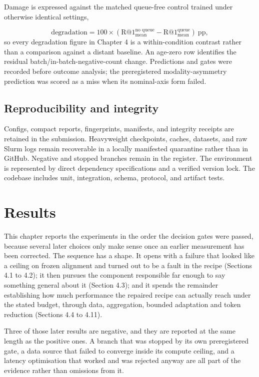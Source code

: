 \documentclass[11pt,a4paper,oneside]{report}
\begin{document}
Damage is expressed against the matched queue-free control trained under otherwise identical settings,

\begin{equation*}
\mathrm{degradation} = 100 \times
\left( \mathrm{R@1}^{\text{no queue}}_{\text{mean}}
     - \mathrm{R@1}^{\text{queue}}_{\text{mean}} \right)
\ \text{pp},
\end{equation*}
so every degradation figure in Chapter 4 is a within-condition contrast rather than a comparison against a distant baseline. An age-zero row identifies the residual batch/in-batch-negative-count change. Predictions and gates were recorded before outcome analysis; the preregistered modality-asymmetry prediction was scored as a miss when its nominal-axis form failed.

\section{Reproducibility and integrity}
Configs, compact reports, fingerprints, manifests, and integrity receipts are retained in the submission. Heavyweight checkpoints, caches, datasets, and raw Slurm logs remain recoverable in a locally manifested quarantine rather than in GitHub. Negative and stopped branches remain in the register. The environment is represented by direct dependency specifications and a verified version lock. The codebase includes unit, integration, schema, protocol, and artifact tests.

\chapter{Results}
This chapter reports the experiments in the order the decision gates were passed, because several later choices only make sense once an earlier measurement has been corrected. The sequence has a shape. It opens with a failure that looked like a ceiling on frozen alignment and turned out to be a fault in the recipe (Sections 4.1 to 4.2); it then pursues the component responsible far enough to say something general about it (Section 4.3); and it spends the remainder establishing how much performance the repaired recipe can actually reach under the stated budget, through data, aggregation, bounded adaptation and token reduction (Sections 4.4 to 4.11).

Three of those later results are negative, and they are reported at the same length as the positive ones. A branch that was stopped by its own preregistered gate, a data source that failed to converge inside its compute ceiling, and a latency optimisation that worked and was rejected anyway are all part of the evidence rather than omissions from it.
\end{document}
